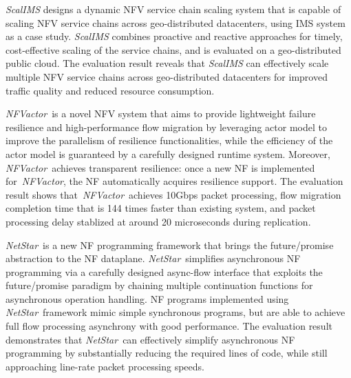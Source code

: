 \documentclass[a4paper, 11pt, oneside]{Thesis}  %
\def\netstar{\textit{NetStar}}
\def\nfactor{\textit{NFVactor}}
\begin{document}
{\textit{ScalIMS} designs a dynamic NFV service chain scaling system that is capable of scaling NFV service chains across geo-distributed datacenters, using IMS system as a case study. \textit{ScalIMS} combines proactive and reactive approaches for timely, cost-effective scaling of the service chains, and is evaluated on a geo-distributed public cloud. The evaluation result reveals that \textit{ScalIMS} can effectively scale multiple NFV service chains across geo-distributed datacenters for improved traffic quality and reduced resource consumption.

\nfactor~is a novel NFV system that aims to provide lightweight failure resilience and high-performance flow migration by leveraging actor model to improve the parallelism of resilience functionalities, while the efficiency of the actor model is guaranteed by a carefully designed runtime system. Moreover, \nfactor~achieves transparent resilience: once a new NF is implemented for~\nfactor, the NF automatically acquires resilience support. The evaluation result shows that~\nfactor~achieves 10Gbps packet processing, flow migration completion time that is 144 times faster than existing system, and packet processing delay stablized at around 20 microseconds during replication.

\netstar~is a new NF programming framework that brings the future/promise abstraction to the NF dataplane. \netstar~simplifies asynchronous NF programming via a carefully designed async-flow interface that exploits the future/promise paradigm by chaining multiple continuation functions for asynchronous operation handling. NF programs implemented using \netstar~framework mimic simple synchronous programs, but are able to achieve full flow processing asynchrony with good performance. The evaluation result demonstrates that \netstar~can effectively simplify asynchronous NF programming by substantially reducing the required lines of code, while still approaching line-rate packet processing speeds.

\vspace{1em}
\noindent [{\bf 471 Words}]
}

\clearpage  %

\end{document}
